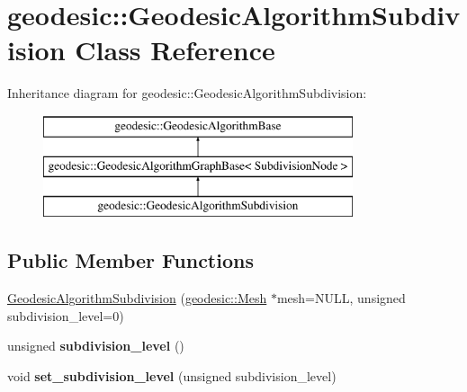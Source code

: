 \hypertarget{classgeodesic_1_1_geodesic_algorithm_subdivision}{}\section{geodesic\+:\+:Geodesic\+Algorithm\+Subdivision Class Reference}
\label{classgeodesic_1_1_geodesic_algorithm_subdivision}
Inheritance diagram for geodesic\+:\+:Geodesic\+Algorithm\+Subdivision\+:\begin{figure}[H]
\begin{center}
\leavevmode
\includegraphics[height=3.000000cm]{classgeodesic_1_1_geodesic_algorithm_subdivision}
\end{center}
\end{figure}
\subsection*{Public Member Functions}
\begin{DoxyCompactItemize}
\item 
\hyperlink{classgeodesic_1_1_geodesic_algorithm_subdivision_a72dacc31bf5f71a59ab7af93d9f798a9}{Geodesic\+Algorithm\+Subdivision} (\hyperlink{classgeodesic_1_1_mesh}{geodesic\+::\+Mesh} $\ast$mesh=N\+U\+L\+L, unsigned subdivision\+\_\+level=0)
\item 
\hypertarget{classgeodesic_1_1_geodesic_algorithm_subdivision_aad6c35c368039996b56bd119f6053731}{}unsigned {\bfseries subdivision\+\_\+level} ()\label{classgeodesic_1_1_geodesic_algorithm_subdivision_aad6c35c368039996b56bd119f6053731}

\item 
\hypertarget{classgeodesic_1_1_geodesic_algorithm_subdivision_a3af97fcc59f11dc2eed03e9b83e0c91a}{}void {\bfseries set\+\_\+subdivision\+\_\+level} (unsigned subdivision\+\_\+level)\label{classgeodesic_1_1_geodesic_algorithm_subdivision_a3af97fcc59f11dc2eed03e9b83e0c91a}

\end{DoxyCompactItemize}
